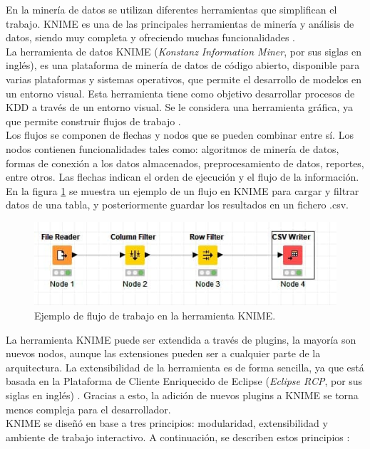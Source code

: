 En la minería de datos se utilizan diferentes herramientas que simplifican el trabajo. KNIME es una de las principales herramientas de minería y análisis de datos, siendo muy completa y ofreciendo muchas funcionalidades \citep{Lisandra2012}. \\
La herramienta de datos KNIME (\textit{Konstanz Information Miner}, por sus siglas en inglés), es una plataforma de minería de datos de código abierto, disponible para varias plataformas y sistemas operativos, que permite el desarrollo de modelos en un entorno visual. Esta herramienta tiene como objetivo desarrollar procesos de KDD a través de un entorno visual. Se le considera una herramienta gráfica, ya que permite construir flujos de trabajo \citep{KNIME2023}. \\
Los flujos se componen de flechas y nodos que se pueden combinar entre sí. Los nodos contienen funcionalidades tales como: algoritmos de minería de datos, formas de conexión a los datos almacenados, preprocesamiento de datos, reportes, entre otros. Las flechas indican el orden de ejecución y el flujo de la información. En la figura \ref{fig:ejemploworkflow} se muestra un ejemplo de un flujo en KNIME para cargar y filtrar datos de una tabla, y posteriormente guardar los resultados en un fichero .csv. 
\begin{figure}[H]
	\centering
	\includegraphics[width=0.9\linewidth]{figuras/capi 1/ejemplo_workflow}
	\caption{Ejemplo de flujo de trabajo en la herramienta KNIME.}
	\label{fig:ejemploworkflow}
\end{figure}

La herramienta KNIME puede ser extendida a través de plugins, la mayoría son nuevos nodos, aunque las extensiones pueden ser a cualquier parte de la arquitectura. La extensibilidad de la herramienta es de forma sencilla, ya que está basada en la Plataforma de Cliente Enriquecido de Eclipse (\textit{Eclipse RCP}, por sus siglas en inglés) \citep{berthold2009knime}. Gracias a esto, la adición de nuevos plugins a KNIME se torna menos compleja para el desarrollador. \\
KNIME se diseñó en base a tres principios: modularidad, extensibilidad y ambiente de trabajo interactivo. A continuación, se describen estos principios \citep{Lisandra2012}:

